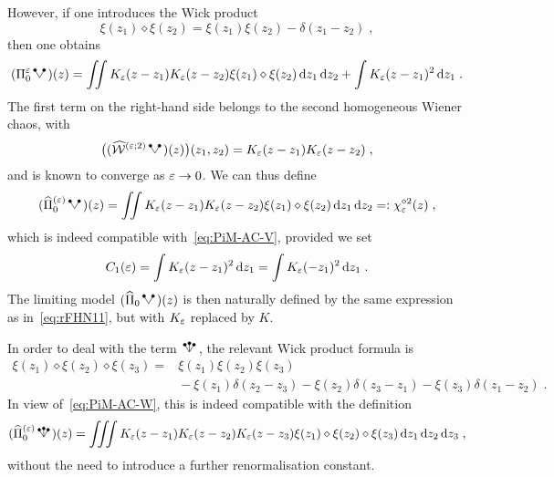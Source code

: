 \documentclass[reqno,11pt]{article}
\begin{document}
However, if one introduces the Wick product 
\begin{equation}
 \label{eq:rFHN08}
 \xi(z_1)\diamond\xi(z_2) = \xi(z_1)\xi(z_2) - \delta(z_1-z_2)\;, 
\end{equation} 
then one obtains 
\begin{equation}
 \label{eq:rFHN09}
 (\Pi_0^\eps \RSV)(z) 
 = \iint K_\eps(z-z_1)K_\eps(z-z_2)\xi(z_1)\diamond\xi(z_2) \6z_1\6z_2 
 + \int K_\eps(z-z_1)^2\6z_1\;.
\end{equation} 
The first term on the right-hand side belongs to the second homogeneous Wiener
chaos, with 
\begin{equation}
 \label{eq:rFHN10} 
 \bigpar{(\widehat\cW^{(\eps;2)}\RSV)(z)}(z_1,z_2) =
K_\eps(z-z_1)K_\eps(z-z_2)\;,
\end{equation} 
and is known to converge as $\varepsilon\to0$. We can thus define 
\begin{equation}
 \label{eq:rFHN11}
 (\widehat\Pi_0^{(\eps)} \RSV)(z) 
 = \iint K_\eps(z-z_1)K_\eps(z-z_2)\xi(z_1)\diamond\xi(z_2) \6z_1\6z_2
 =: \chi_\eps^{\diamond 2}(z)\;,
\end{equation} 
which is indeed compatible with~\eqref{eq:PiM-AC-V},
provided we set 
\begin{equation}
 \label{eq:rFHN12}
 C_1(\eps) = \int K_\eps(z-z_1)^2\6z_1 = \int K_\eps(-z_1)^2\6z_1\;.
\end{equation} 
The limiting model $(\widehat\Pi_0 \RSV)(z)$ is then naturally defined by the
same expression as in~\eqref{eq:rFHN11}, but with $K_\varepsilon$ replaced by $K$.

In order to deal with the term $\RSW$, the relevant Wick product formula is 
\begin{align}
\nonumber
\xi(z_1)\diamond\xi(z_2)\diamond\xi(z_3) 
 {}={} & \xi(z_1)\xi(z_2)\xi(z_3) \\
 & {}- \xi(z_1)\delta(z_2-z_3) - \xi(z_2)\delta(z_3-z_1) 
 - \xi(z_3)\delta(z_1-z_2)\;.
\label{eq:rFHN13} 
\end{align} 
In view of~\eqref{eq:PiM-AC-W}, this is indeed compatible
with the definition 
\begin{equation}
 \label{eq:rFHN14}
 (\widehat\Pi_0^{(\eps)} \RSW)(z) 
 = \iiint K_\eps(z-z_1)K_\eps(z-z_2)K_\eps(z-z_3)
 \xi(z_1)\diamond\xi(z_2)\diamond\xi(z_3)
 \6z_1\6z_2\6z_3\;,
\end{equation} 
without the need to introduce a further renormalisation constant. 
\end{document}
